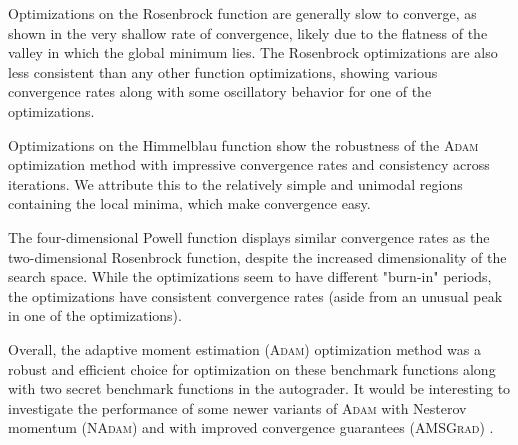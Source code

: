 \documentclass[conference]{IEEEtran}
\begin{document}
Optimizations on the Rosenbrock function are generally slow to converge, as shown in the very shallow rate of convergence, likely due to the flatness of the valley in which the global minimum lies. The Rosenbrock optimizations are also less consistent than any other function optimizations, showing various convergence rates along with some oscillatory behavior for one of the optimizations. 

Optimizations on the Himmelblau function show the robustness of the \textsc{Adam} optimization method with impressive convergence rates and consistency across iterations. We attribute this to the relatively simple and unimodal regions containing the local minima, which make convergence easy.

The four-dimensional Powell function displays similar convergence rates as the two-dimensional Rosenbrock function, despite the increased dimensionality of the search space. While the optimizations seem to have different "burn-in" periods, the optimizations have consistent convergence rates (aside from an unusual peak in one of the optimizations).

Overall, the adaptive moment estimation (\textsc{Adam}) optimization method was a robust and efficient choice for optimization on these benchmark functions along with two secret benchmark functions in the autograder. It would be interesting to investigate the performance of some newer variants of \textsc{Adam} with Nesterov momentum (\textsc{NAdam}) \cite{Dozat2016IncorporatingAdam} and with improved convergence guarantees (\textsc{AMSGrad}) \cite{Reddi2018OnBeyond}.



\end{document}
